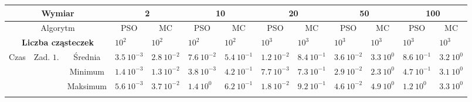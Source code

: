 \documentclass[11pt, a4paper, oneside]{article}
\begin{document}
\renewcommand{\arraystretch}{2}
\begin{table}[H]
\scriptsize
\begin{adjustwidth}{-1.76cm}{}
\centering
\begin{tabular}{|c|c|c|l|l|l|l|l|l|c|c|c|c|}
\hline
\multicolumn{3}{|c|}{Wymiar}                                   & \multicolumn{2}{c|}{2}                             & \multicolumn{2}{c|}{10}                            & \multicolumn{2}{c|}{20}                            & \multicolumn{2}{c|}{50}                                                         & \multicolumn{2}{c|}{100}                                                        \\ \hline
\multicolumn{3}{|c|}{Algorytm}                                 & \multicolumn{1}{c|}{PSO} & \multicolumn{1}{c|}{MC} & \multicolumn{1}{c|}{PSO} & \multicolumn{1}{c|}{MC} & \multicolumn{1}{c|}{PSO} & \multicolumn{1}{c|}{MC} & PSO                                    & MC                                     & PSO                                    & MC                                     \\ \hline
\multicolumn{3}{|c|}{\textbf{Liczba cząsteczek}}               & \textbf{$10^{2}$}        & \textbf{$10^{2}$}       & \textbf{$10^{2}$}        & \textbf{$10^{2}$}       & \textbf{$10^{3}$}        & \textbf{$10^{3}$}       & \multicolumn{1}{l|}{\textbf{$10^{3}$}} & \multicolumn{1}{l|}{\textbf{$10^{3}$}} & \multicolumn{1}{l|}{\textbf{$10^{3}$}} & \multicolumn{1}{l|}{\textbf{$10^{3}$}} \\ \hline
\multirow{4}{*}{Czas} & \multirow{4}{*}{Zad. $1$.} & Średnia   & $3.5 \ 10^{-3}$          & $2.8 \ 10^{-2}$         & $7.6 \ 10^{-2}$          & $5.4 \ 10^{-1}$         & $1.2 \ 10^{-2}$          & $8.4 \ 10^{-1}$         & \multicolumn{1}{l|}{$3.6 \ 10^{-2}$}   & \multicolumn{1}{l|}{$3.3 \ 10^{0}$}    & \multicolumn{1}{l|}{$8.6 \ 10^{-1}$}   & \multicolumn{1}{l|}{$3.2 \ 10^{0}$}    \\ \cline{3-13} 
                      &                            & Minimum   & $1.4 \ 10^{-3}$          & $1.3 \ 10^{-2}$         & $3.8 \ 10^{-3}$          & $4.2 \ 10^{-1}$         & $7.7 \ 10^{-3}$          & $7.3 \ 10^{-1}$         & \multicolumn{1}{l|}{$2.9 \ 10^{-2}$}   & \multicolumn{1}{l|}{$2.3 \ 10^{0}$}    & \multicolumn{1}{l|}{$4.7 \ 10^{-1}$}   & \multicolumn{1}{l|}{$3.1 \ 10^{0}$}    \\ \cline{3-13} 
                      &                            & Maksimum  & $5.6 \ 10^{-3}$          & $3.7 \ 10^{-2}$         & $1.4 \ 10^{0}$           & $6.2 \ 10^{-1}$         & $1.8 \ 10^{-2}$          & $9.2 \ 10^{-1}$         & \multicolumn{1}{l|}{$4.6 \ 10^{-2}$}   & \multicolumn{1}{l|}{$4.9 \ 10^{0}$}    & \multicolumn{1}{l|}{$1.2 \ 10^{0}$}    & \multicolumn{1}{l|}{$3.3 \ 10^{0}$}    \\ \cline{3-13} 

\end{tabular}
\end{adjustwidth}
\end{table}
\end{document}
